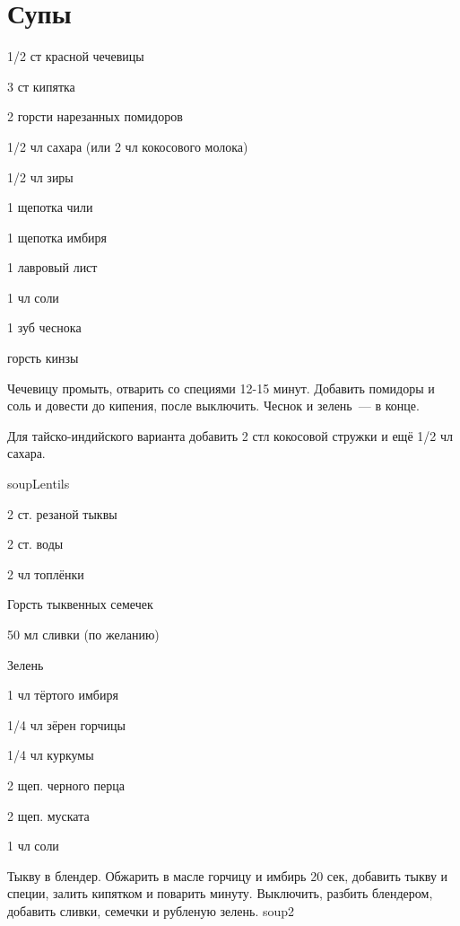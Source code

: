 
\chapter*{Супы}
\label{sec:soup}



{
\item 1/2 ст красной чечевицы
\item 3 ст кипятка
\item 2 горсти нарезанных помидоров
}{
\item 1/2 чл сахара (или 2 чл кокосового молока)
\item 1/2 чл зиры
\item 1 щепотка чили
\item 1 щепотка имбиря
\item 1 лавровый лист
\item 1 чл соли
\item 1 зуб чеснока
\item горсть кинзы
}{
Чечевицу промыть, отварить со специями 12-15 минут. Добавить помидоры и соль и довести до кипения, после выключить. Чеснок и зелень~--- в конце. %
}{
\begin{advice}
\item Для тайско-индийского варианта добавить 2 стл кокосовой стружки и ещё 1/2 чл сахара.
\end{advice}}{soupLentils}




{
\item 2 ст. резаной тыквы
\item 2 ст. воды
\item 2 чл топлёнки
\item Горсть тыквенных семечек 
\item 50 мл сливки (по желанию)
\item Зелень
}{
\item 1 чл тёртого имбиря
\item 1/4 чл зёрен горчицы
\item 1/4 чл куркумы
\item 2 щеп. черного перца
\item 2 щеп. муската
\item 1 чл соли
}
{
Тыкву в блендер. Обжарить в масле горчицу и имбирь 20 сек, добавить тыкву и специи, залить кипятком и поварить минуту. Выключить, разбить блендером, добавить сливки, семечки и рубленую зелень. 
}{}{soup2}

